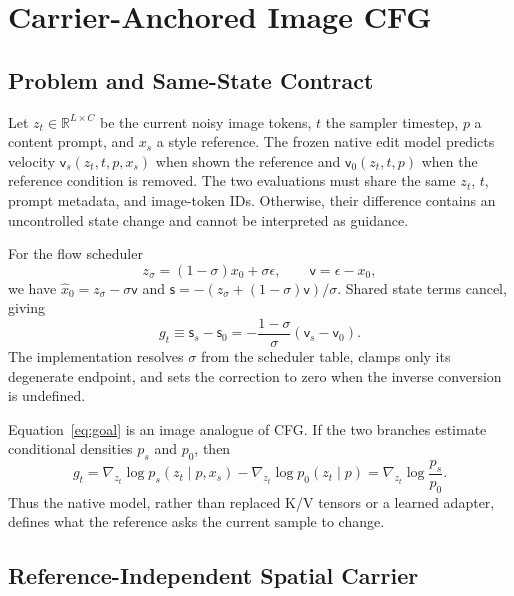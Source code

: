 \documentclass[10pt,letterpaper]{article}
\newcommand{\score}{\mathsf{s}}
\newcommand{\vel}{\mathsf{v}}
\newcommand{\R}{\mathbb{R}}
\begin{document}
\section{Carrier-Anchored Image CFG}

\subsection{Problem and Same-State Contract}

Let $z_t\in\R^{L\times C}$ be the current noisy image tokens, $t$ the sampler
timestep, $p$ a content prompt, and $x_s$ a style reference. The frozen native
edit model predicts velocity $\vel_s(z_t,t,p,x_s)$ when shown the reference and
$\vel_0(z_t,t,p)$ when the reference condition is removed. The two evaluations
must share the same $z_t$, $t$, prompt metadata, and image-token IDs. Otherwise,
their difference contains an uncontrolled state change and cannot be
interpreted as guidance.

For the flow scheduler
\begin{equation}
 z_\sigma=(1-\sigma)x_0+\sigma\epsilon,\qquad
 \vel=\epsilon-x_0,
 \label{eq:flow}
\end{equation}
we have $\hat x_0=z_\sigma-\sigma\vel$ and
$\score=-(z_\sigma+(1-\sigma)\vel)/\sigma$. Shared state terms cancel, giving
\begin{equation}
 g_t \equiv \score_s-\score_0
 =-\frac{1-\sigma}{\sigma}(\vel_s-\vel_0).
 \label{eq:goal}
\end{equation}
The implementation resolves $\sigma$ from the scheduler table, clamps only its
degenerate endpoint, and sets the correction to zero when the inverse
conversion is undefined.

Equation~\ref{eq:goal} is an image analogue of CFG. If the two branches
estimate conditional densities $p_s$ and $p_0$, then
\begin{equation}
 g_t=\nabla_{z_t}\log p_s(z_t\mid p,x_s)
     -\nabla_{z_t}\log p_0(z_t\mid p)
 =\nabla_{z_t}\log\frac{p_s}{p_0}.
 \label{eq:ratio}
\end{equation}
Thus the native model, rather than replaced K/V tensors or a learned adapter,
defines what the reference asks the current sample to change.

\subsection{Reference-Independent Spatial Carrier}
\end{document}
